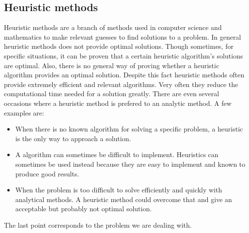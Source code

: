 \subsection{Heuristic methods}
Heuristic methods are a branch of methods used in computer science and mathematics to make relevant guesses to find solutions to a problem. In general heuristic methods does not provide optimal solutions. Though sometimes, for specific situations, it can be proven that a certain heuristic algorithm's solutions are optimal. Also, there is no general way of proving whether a heuristic algorithm provides an optimal solution. Despite this fact heuristic methods often provide extremely efficient and relevant algorithms. Very often they reduce the computational time needed for a solution greatly. There are even several occasions where a heuristic method is prefered to an analytic method. A few examples are:
\begin{itemize}
\item When there is no known algorithm for solving a specific problem, a heuristic is the only way to approach a solution.
\item A algorithm can sometimes be difficult to implement. Heuristics can sometimes be used instead because they are easy to implement and known to produce good results.
\item When the problem is too difficult to solve efficiently and quickly with analytical methods. A heuristic method could overcome that and give an acceptable but probably not optimal solution.
\end{itemize}

The last point corresponds to the problem we are dealing with.